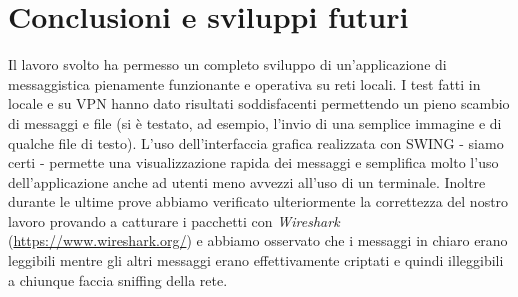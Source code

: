 \section{Conclusioni e sviluppi futuri}
Il lavoro svolto ha permesso un completo sviluppo di un'applicazione di
messaggistica pienamente funzionante e operativa su reti locali. I test
fatti in locale e su VPN hanno dato risultati soddisfacenti permettendo un
pieno scambio di messaggi e file (si è testato, ad esempio, l'invio di
una semplice immagine e di qualche file di testo). L'uso dell'interfaccia grafica realizzata con
SWING - siamo certi - permette una visualizzazione rapida dei messaggi
e semplifica molto l'uso dell'applicazione anche ad
utenti meno avvezzi all'uso di un terminale.
Inoltre durante le ultime prove abbiamo verificato ulteriormente la correttezza del
nostro lavoro provando a catturare i pacchetti con \emph{Wireshark} (\url{https://www.wireshark.org/})
e abbiamo osservato che i messaggi in chiaro erano leggibili mentre gli altri messaggi erano effettivamente
criptati e quindi illeggibili a chiunque faccia sniffing della rete.

